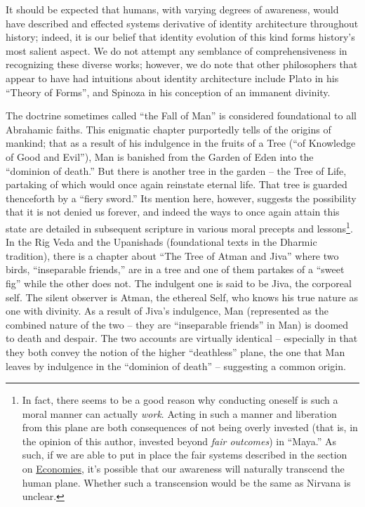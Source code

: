 \documentclass[pra,twocolumn,groupedaddress,10pt]{revtex4}
\theoremstyle{definition}
\begin{document}
It should be expected that humans, with varying degrees of awareness, would have described and effected systems derivative of identity architecture throughout history; indeed, it is our belief that identity evolution of this kind forms history's most salient aspect. We do not attempt any semblance of comprehensiveness in recognizing these diverse works; however, we do note that other philosophers that appear to have had intuitions about identity architecture include Plato in his ``Theory of Forms''\cite{plato}, and Spinoza\cite{spinoza} in his conception of an immanent divinity.

The doctrine sometimes called ``the Fall of Man'' is considered foundational to all Abrahamic faiths. This enigmatic chapter purportedly tells of the origins of mankind; that as a result of his indulgence in the fruits of a Tree (``of Knowledge of Good and Evil''), Man is banished from the Garden of Eden into the ``dominion of death.''\cite{genesisfallofman} But there is another tree in the garden -- the Tree of Life, partaking of which would once again reinstate eternal life. That tree is guarded thenceforth by a ``fiery sword.'' Its mention here, however, suggests the possibility that it is not denied us forever, and indeed the ways to once again attain this state are detailed in subsequent scripture in various moral precepts and lessons\footnote{In fact, there seems to be a good reason why conducting oneself is such a moral manner can actually \textit{work}. Acting in such a manner and liberation from this plane are both consequences of not being overly invested (that is, in the opinion of this author, invested beyond \textit{fair outcomes}) in ``Maya.'' As such, if we are able to put in place the fair systems described in the section on \hyperref[sec:ecogovintpro]{Economies}, it's possible that our awareness will naturally transcend the human plane. Whether such a transcension would be the same as Nirvana is unclear.}. In the Rig Veda and the Upanishads (foundational texts in the Dharmic tradition), there is a chapter about ``The Tree of Atman and Jiva''\cite{mundakaupanishad} where two birds, ``inseparable friends,'' are in a tree and one of them partakes of a ``sweet fig'' while the other does not. The indulgent one is said to be Jiva, the corporeal self. The silent observer is Atman, the ethereal Self, who knows his true nature as one with divinity. As a result of Jiva's indulgence, Man (represented as the combined nature of the two -- they are ``inseparable friends'' in Man) is doomed to death and despair. The two accounts are virtually identical -- especially in that they both convey the notion of the higher ``deathless'' plane, the one that Man leaves by indulgence in the ``dominion of death'' -- suggesting a common origin.
\end{document}
